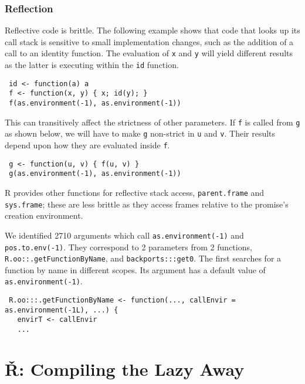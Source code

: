 \documentclass[review,creen,acmsmall]{acmart}
\newcommand{\code}[1]{\lstinline |#1|\xspace}
\renewcommand{\c}[1]{\lstinline |#1|\xspace}
\renewcommand{\Rsh}{{\sf\v R}\xspace}
\begin{document}
\subsubsection{Reflection}
Reflective code is brittle. The following example shows that code that looks up
its call stack is sensitive to small implementation changes, such as the
addition of a call to an identity function. The evaluation of \c x and \c y will
yield different results as the latter is executing within the \c{id} function.
%
\begin{lstlisting}
 id <- function(a) a
 f <- function(x, y) { x; id(y); }
 f(as.environment(-1), as.environment(-1))
\end{lstlisting}
%
\noindent
This can transitively affect the strictness of other parameters. If \code{f} is
called from \code{g} as shown below, we will have to make \code{g} non-strict in
\code{u} and \code{v}. Their results depend upon how they are evaluated inside
\code{f}.

\begin{lstlisting}
 g <- function(u, v) { f(u, v) }
 g(as.environment(-1), as.environment(-1))
\end{lstlisting}
%
\noindent
R provides other functions for reflective stack access, \code{parent.frame} and
\code{sys.frame}; these are less brittle as they access frames relative to the
promise's creation environment.

We identified 2710 arguments which call \code{as.environment(-1)} and
\code{pos.to.env(-1)}. They correspond to 2 parameters from 2 functions,
\code{R.oo::.getFunctionByName}, and \code{backports:::get0}.
%
The first searches for a function by name in different scopes. Its argument has
a default value of \code{as.environment(-1)}.
%
\begin{lstlisting}
 R.oo:::.getFunctionByName <- function(..., callEnvir = as.environment(-1L), ...) {
   envirT <- callEnvir
   ...
\end{lstlisting}
%

\section{\Rsh: Compiling the Lazy Away}\label{sec:rsh}
\end{document}
